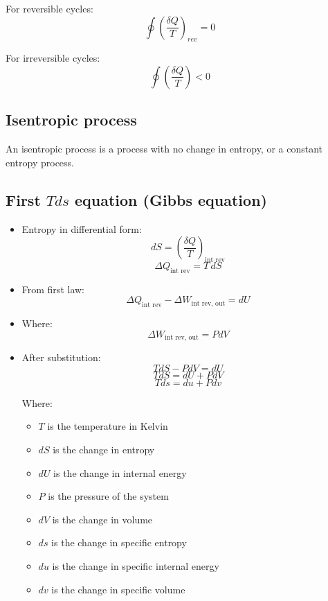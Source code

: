 \documentclass[11pt]{article}
\begin{document}
For reversible cycles:
\[\oint \left(\frac{\delta Q}{T} \right)_{rev} = 0\]

For irreversible cycles:
\[\oint \left(\frac{\delta Q}{T} \right) < 0\]
\subsection{Isentropic process}
\label{sec:org6c8af2f}
An isentropic process is a process with no change in entropy, or a constant entropy process.

 \newpage
\subsection{First \(T ds\) equation (Gibbs equation)}
\label{sec:orga5f9474}
\begin{itemize}
\item Entropy in differential form:
\[dS = \left(\frac{\delta Q}{T} \right)_{\text{int rev}}\]
\[\Delta Q_{\text{int rev}} = T \, dS\]
\item From first law:
\[\Delta Q_{\text{int rev}} - \Delta W_{\text{int rev, out}} = dU\]
\item Where:
\[\Delta W_{\text{int rev, out}} = P dV\]
\item After substitution:
\[T dS - P dV = dU\]
\[TdS = dU + P dV\]
\[Tds = du + P dv\]

Where:
\begin{itemize}
\item \(T\) is the temperature in Kelvin
\item \(dS\) is the change in entropy
\item \(dU\) is the change in internal energy
\item \(P\) is the pressure of the system
\item \(dV\) is the change in volume
\item \(ds\) is the change in specific entropy
\item \(du\) is the change in specific internal energy
\item \(dv\) is the change in specific volume
\end{itemize}
\end{itemize}

 \newpage
\end{document}
